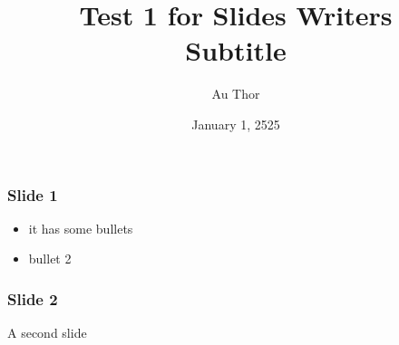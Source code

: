 \documentclass[t,english]{beamer}
\begin{document}
\title[Test 1 for Slides Writers]{Test 1 for Slides Writers%
  \label{test-1-for-slides-writers}%
  \\ %
  \large{Subtitle}%
  \label{subtitle}}
\author[Au Thor]{Au Thor}
\date{January 1, 2525}
\maketitle

\begin{frame}[fragile]
\frametitle{Slide 1}

\begin{itemize}[<+-| alert@+>]

\item it has some bullets

\item bullet 2
\end{itemize}
\end{frame}

\begin{frame}[fragile]
\frametitle{Slide 2}


A second slide
\end{frame}
\end{document}
